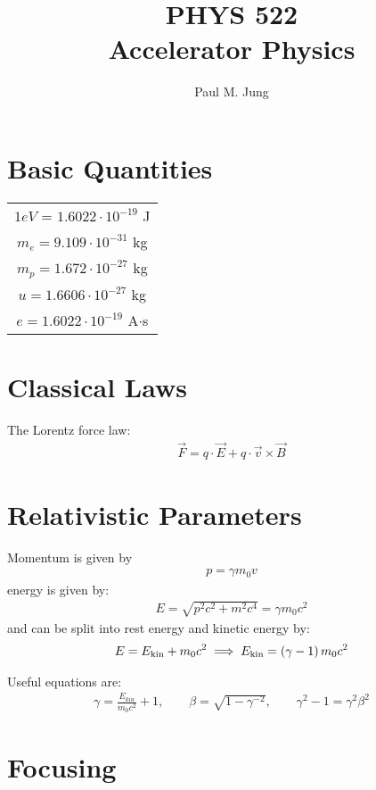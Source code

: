 \documentclass{article}
\title{PHYS 522 \\ Accelerator Physics}
\author{ Paul M. Jung }
\numberwithin{equation}{section}
\begin{document}
\maketitle

\tableofcontents

\section{Basic Quantities}

\begin{tabular}{ c }
$1 eV$ = $1.6022 \cdot 10^{-19}$ J \\
$m_e = 9.109 \cdot 10^{-31} $ kg \\
$m_p = 1.672 \cdot 10^{-27}$ kg \\
$u = 1.6606 \cdot 10^{-27}$ kg \\
$e = 1.6022 \cdot 10^{-19}$ A$\cdot$s
\end{tabular}

\section{Classical Laws}
The Lorentz force law:
\begin{align}
\vec{F} = q \cdot \vec{E} + q \cdot \vec{v} \times \vec{B}
\end{align}

\section{Relativistic Parameters}
Momentum is given by 
\begin{align}
p = \gamma m_0 v
\end{align}
energy is given by:
\begin{align}
E = \sqrt{p^2 c^2 + m^2 c^4} = \gamma m_0 c^2
\end{align}
and can be split into rest energy and kinetic energy by:
\begin{align}
E = E_{\rm kin} + m_0 c^2 \implies E_{\rm kin} = \left( \gamma -1 \right) m_0 c^2
\end{align}

Useful equations are:
\begin{align}
\gamma = \frac{E_{kin}}{m_0 c^2}+1 , \qquad \beta = \sqrt{1-\gamma^{-2}} ,\qquad \gamma^2-1 = \gamma^2 \beta^2
\end{align}

\section{Focusing}
\end{document}
